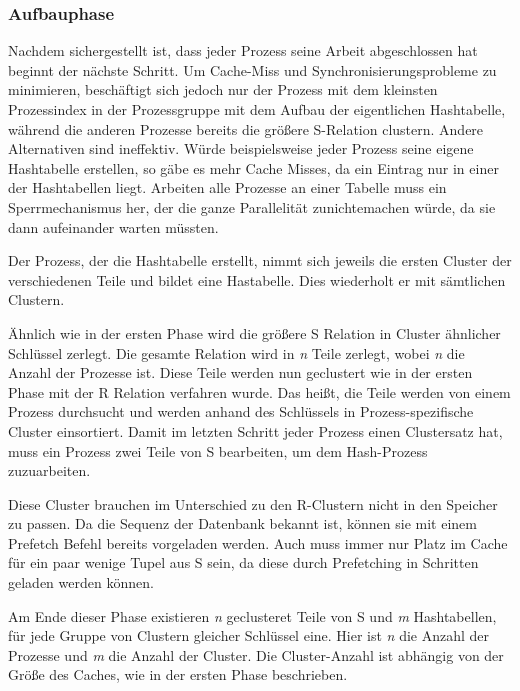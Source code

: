 \subsubsection*{Aufbauphase}
\label{sec:AA_Hash-Join_Aufbauphase}

Nachdem sichergestellt ist, dass jeder Prozess seine Arbeit abgeschlossen hat beginnt der nächste Schritt. Um Cache-Miss und Synchronisierungsprobleme zu minimieren, beschäftigt sich jedoch nur der Prozess mit dem kleinsten Prozessindex in der Prozessgruppe mit dem Aufbau der eigentlichen Hashtabelle, während die anderen Prozesse bereits die größere S-Relation clustern. Andere Alternativen sind ineffektiv. Würde beispielsweise jeder Prozess seine eigene Hashtabelle erstellen, so gäbe es mehr Cache Misses, da ein Eintrag nur in einer der Hashtabellen liegt. Arbeiten alle Prozesse an einer Tabelle muss ein Sperrmechanismus her, der die ganze Parallelität zunichtemachen würde, da sie dann aufeinander warten müssten.

Der Prozess, der die Hashtabelle erstellt, nimmt sich jeweils die ersten Cluster der verschiedenen Teile und bildet eine Hastabelle. Dies wiederholt er mit sämtlichen Clustern.

Ähnlich wie in der ersten Phase wird die größere S Relation in Cluster ähnlicher Schlüssel zerlegt. Die gesamte Relation wird in \textit{n} Teile zerlegt, wobei \textit{n} die Anzahl der Prozesse ist. Diese Teile werden nun geclustert wie in der ersten Phase mit der R Relation verfahren wurde. Das heißt, die Teile werden von einem Prozess durchsucht und werden anhand des Schlüssels in Prozess-spezifische Cluster einsortiert. Damit im letzten Schritt jeder Prozess einen Clustersatz hat, muss ein Prozess zwei Teile von S bearbeiten, um dem Hash-Prozess zuzuarbeiten.

Diese Cluster brauchen im Unterschied zu den R-Clustern nicht in den Speicher zu passen. Da die Sequenz der Datenbank bekannt ist, können sie mit einem Prefetch Befehl bereits vorgeladen werden. Auch muss immer nur Platz im Cache für ein paar wenige Tupel aus S sein, da diese durch Prefetching in Schritten geladen werden können.

Am Ende dieser Phase existieren \textit{n} geclusteret Teile von S und \textit{m} Hashtabellen, für jede Gruppe von Clustern gleicher Schlüssel eine. Hier ist \textit{n} die Anzahl der Prozesse und \textit{m} die Anzahl der Cluster. Die Cluster-Anzahl ist abhängig von der Größe des Caches, wie in der ersten Phase beschrieben.

